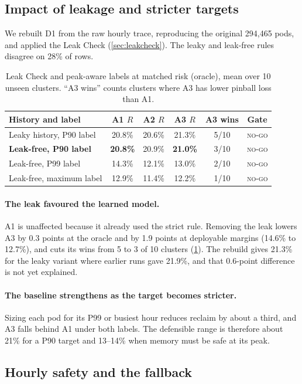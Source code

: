 \documentclass[10pt]{article}
\newcommand{\finding}[1]{\paragraph{#1}}
\begin{document}
\subsection{Impact of leakage and stricter targets}
\label{sec:q3}

We rebuilt D1 from the raw hourly trace, reproducing the original 294{,}465 pods, and applied the Leak Check (\cref{sec:leakcheck}). The leaky and leak-free rules disagree on 28\% of rows.

\begin{table}[t]
\centering\small
\caption{Leak Check and peak-aware labels at matched risk (oracle), mean over 10 unseen clusters. ``A3 wins'' counts clusters where A3 has lower pinball loss than A1.}
\label{tab:e9}
\begin{tabular}{@{}lccccc@{}}
\toprule
History and label & A1 $R$ & A2 $R$ & A3 $R$ & A3 wins & Gate \\
\midrule
Leaky history, P90 label & 20.8\% & 20.6\% & 21.3\% & 5/10 & \textsc{no-go} \\
\textbf{Leak-free, P90 label} & \textbf{20.8\%} & 20.9\% & \textbf{21.0\%} & 3/10 & \textsc{no-go} \\
Leak-free, P99 label & 14.3\% & 12.1\% & 13.0\% & 2/10 & \textsc{no-go} \\
Leak-free, maximum label & 12.9\% & 11.4\% & 12.2\% & 1/10 & \textsc{no-go} \\
\bottomrule
\end{tabular}
\end{table}

\finding{The leak favoured the learned model.} A1 is unaffected because it already used the strict rule. Removing the leak lowers A3 by 0.3 points at the oracle and by 1.9 points at deployable margins (14.6\% to 12.7\%), and cuts its wins from 5 to 3 of 10 clusters (\cref{tab:e9}). The rebuild gives 21.3\% for the leaky variant where earlier runs gave 21.9\%, and that 0.6-point difference is not yet explained.

\finding{The baseline strengthens as the target becomes stricter.} Sizing each pod for its P99 or busiest hour reduces reclaim by about a third, and A3 falls behind A1 under both labels. The defensible range is therefore about 21\% for a P90 target and 13--14\% when memory must be safe at its peak.

\subsection{Hourly safety and the fallback}
\label{sec:q4}
\end{document}
